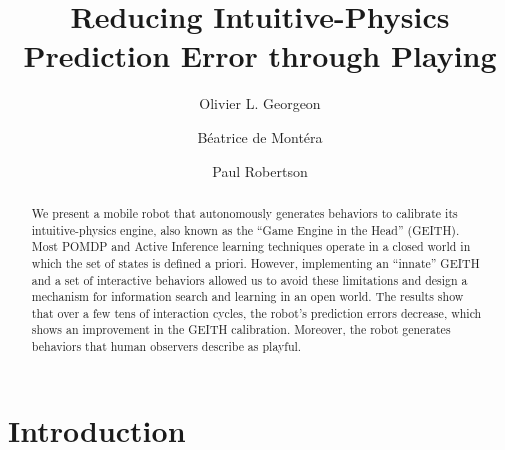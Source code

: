 \documentclass[runningheads]{llncs}
\begin{document}
%
\title{Reducing Intuitive-Physics Prediction Error through Playing}
%
%

\author{Olivier L. Georgeon  \and Béatrice de Montéra  \and Paul Robertson}


%
\maketitle              %
%
\begin{abstract}
We present a mobile robot that autonomously generates behaviors to calibrate its intuitive-physics engine, also known as the ``Game Engine in the Head'' (GEITH).
Most POMDP and Active Inference learning techniques operate in a closed world in which the set of states is defined a priori. 
However, implementing an ``innate'' GEITH and a set of interactive behaviors allowed us to avoid these limitations and design a mechanism for information search and learning in an open world. 
The results show that over a few tens of interaction cycles, the robot's prediction errors decrease, which shows an improvement in the GEITH calibration. 
Moreover, the robot generates behaviors that human observers describe as playful.

\end{abstract}
%
%
%
\section{Introduction}
\label{sec:intro}
\end{document}

